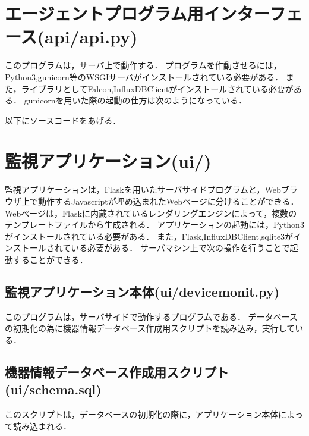 \section*{エージェントプログラム用インターフェース(api/api.py)}
このプログラムは，サーバ上で動作する．
プログラムを作動させるには，Python3,gunicorn等のWSGIサーバがインストールされている必要がある．
また，ライブラリとしてFalcon,InfluxDBClientがインストールされている必要がある．
gunicornを用いた際の起動の仕方は次のようになっている．

以下にソースコードをあげる．


\section*{監視アプリケーション(ui/)}
監視アプリケーションは，Flaskを用いたサーバサイドプログラムと，Webブラウザ上で動作するJavascriptが埋め込まれたWebページに分けることができる．
Webページは，Flaskに内蔵されているレンダリングエンジンによって，複数のテンプレートファイルから生成される．
アプリケーションの起動には，Python3がインストールされている必要がある．
また，Flask,InfluxDBClient,sqlite3がインストールされている必要がある．
サーバマシン上で次の操作を行うことで起動することができる．

\subsection*{監視アプリケーション本体(ui/devicemonit.py)}
このプログラムは，サーバサイドで動作するプログラムである．
データベースの初期化の為に機器情報データベース作成用スクリプトを読み込み，実行している．


\subsection*{機器情報データベース作成用スクリプト(ui/schema.sql)}
このスクリプトは，データベースの初期化の際に，アプリケーション本体によって読み込まれる．




